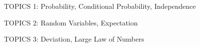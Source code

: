 \documentclass[handout]{mcs}
\begin{document}
\renewcommand{\reading}{
  Notes Ch.\bref{probability_chap}, \textbf{skipping}
  \S\S\bref{cond_ident_subsec}--\bref{aposteriori_subsec},
  \S\bref{birthday_principle_sec}; also \textbf{skip} Ch.18; read
  Ch.\bref{ran_var_examples_sec} \&~\bref{distributions_sec}.}



\begin{staffnotes}
TOPICS 1: Probability, Conditional Probability, Independence 
\end{staffnotes}

\begin{staffnotes}
TOPICS 2: Random Variables, Expectation 
\end{staffnotes} 

\begin{staffnotes}
TOPICS 3: Deviation, Large Law of Numbers
\end{staffnotes}

\end{document}
